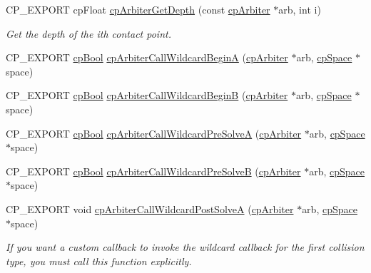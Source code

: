 \begin{DoxyCompactItemize}
C\+P\+\_\+\+E\+X\+P\+O\+RT cp\+Float \hyperlink{group__cpArbiter_ga7946b026663db9e03cacefb655369cd8}{cp\+Arbiter\+Get\+Depth} (const \hyperlink{structcpArbiter}{cp\+Arbiter} $\ast$arb, int i)
\begin{DoxyCompactList}\small\item\em Get the depth of the {\ttfamily ith} contact point. \end{DoxyCompactList}\item 
C\+P\+\_\+\+E\+X\+P\+O\+RT \hyperlink{group__basicTypes_gabc5e752c48f3449ca26ef413ecbd647e}{cp\+Bool} \hyperlink{group__cpArbiter_ga820d3549634a11d573eaa97923d59597}{cp\+Arbiter\+Call\+Wildcard\+BeginA} (\hyperlink{structcpArbiter}{cp\+Arbiter} $\ast$arb, \hyperlink{structcpSpace}{cp\+Space} $\ast$space)
\item 
C\+P\+\_\+\+E\+X\+P\+O\+RT \hyperlink{group__basicTypes_gabc5e752c48f3449ca26ef413ecbd647e}{cp\+Bool} \hyperlink{group__cpArbiter_ga7a0a1ad2040728e877d72ff16868fcef}{cp\+Arbiter\+Call\+Wildcard\+BeginB} (\hyperlink{structcpArbiter}{cp\+Arbiter} $\ast$arb, \hyperlink{structcpSpace}{cp\+Space} $\ast$space)
\item 
C\+P\+\_\+\+E\+X\+P\+O\+RT \hyperlink{group__basicTypes_gabc5e752c48f3449ca26ef413ecbd647e}{cp\+Bool} \hyperlink{group__cpArbiter_ga3e69fd89f304026f6f5248bc49fd6bba}{cp\+Arbiter\+Call\+Wildcard\+Pre\+SolveA} (\hyperlink{structcpArbiter}{cp\+Arbiter} $\ast$arb, \hyperlink{structcpSpace}{cp\+Space} $\ast$space)
\item 
C\+P\+\_\+\+E\+X\+P\+O\+RT \hyperlink{group__basicTypes_gabc5e752c48f3449ca26ef413ecbd647e}{cp\+Bool} \hyperlink{group__cpArbiter_ga61954fc86039826a56e504f483ebe8a6}{cp\+Arbiter\+Call\+Wildcard\+Pre\+SolveB} (\hyperlink{structcpArbiter}{cp\+Arbiter} $\ast$arb, \hyperlink{structcpSpace}{cp\+Space} $\ast$space)
\item 
\mbox{\label{group__cpArbiter_gab5cc72090ced7919e12768dcee35e046}} 
C\+P\+\_\+\+E\+X\+P\+O\+RT void \hyperlink{group__cpArbiter_gab5cc72090ced7919e12768dcee35e046}{cp\+Arbiter\+Call\+Wildcard\+Post\+SolveA} (\hyperlink{structcpArbiter}{cp\+Arbiter} $\ast$arb, \hyperlink{structcpSpace}{cp\+Space} $\ast$space)
\begin{DoxyCompactList}\small\item\em If you want a custom callback to invoke the wildcard callback for the first collision type, you must call this function explicitly. \end{DoxyCompactList}\item 

\end{DoxyCompactItemize}
